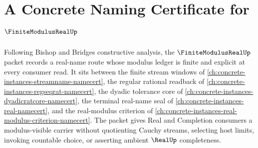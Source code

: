 \chapter{A Concrete Naming Certificate for $\FiniteModulusRealUp$}
\label{ch:concrete-instances-finite-modulus-real-namecert}

Following Bishop and Bridges constructive analysis, the $\FiniteModulusRealUp$ packet records a real-name route whose modulus ledger is finite and explicit at every consumer read. It sits between the finite stream windows of \autoref{ch:concrete-instances-streamname-namecert}, the regular rational readback of \autoref{ch:concrete-instances-regseqrat-namecert}, the dyadic tolerance core of \autoref{ch:concrete-instances-dyadicratcore-namecert}, the terminal real-name seal of \autoref{ch:concrete-instances-real-namecert}, and the real-modulus criterion of \autoref{ch:concrete-instances-real-modulus-criterion-namecert}. The packet gives Real and Completion consumers a modulus-visible carrier without quotienting Cauchy streams, selecting host limits, invoking countable choice, or asserting ambient $\RealUp$ completeness.

